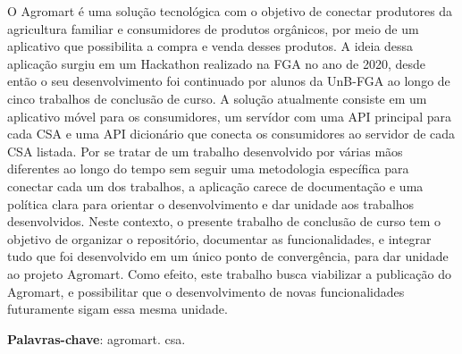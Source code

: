 \begin{resumo}
O Agromart é uma solução tecnológica com o objetivo de conectar produtores da agricultura familiar e consumidores de produtos orgânicos, por meio de um aplicativo que possibilita a compra e venda desses produtos. A ideia dessa aplicação surgiu em um Hackathon realizado na FGA no ano de 2020, desde então o seu desenvolvimento foi continuado por alunos da UnB-FGA ao longo de cinco trabalhos de conclusão de curso. A solução atualmente consiste em um aplicativo móvel para os consumidores, um servídor com uma API principal para cada CSA e uma API dicionário que conecta os consumidores ao servidor de cada CSA listada. Por se tratar de um trabalho desenvolvido por várias mãos diferentes ao longo do tempo sem seguir uma metodologia específica para conectar cada um dos trabalhos, a aplicação carece de documentação e uma política clara para orientar o desenvolvimento e dar unidade aos trabalhos desenvolvidos. Neste contexto, o presente trabalho de conclusão de curso tem o objetivo de organizar o repositório, documentar as funcionalidades, e integrar tudo que foi desenvolvido em um único ponto de convergência, para dar unidade ao projeto Agromart. Como efeito, este trabalho busca viabilizar a publicação do Agromart, e possibilitar que o desenvolvimento de novas funcionalidades futuramente sigam essa mesma unidade.

 \vspace{\onelineskip}
    
 \noindent
 \textbf{Palavras-chave}: agromart. csa. 
\end{resumo}

